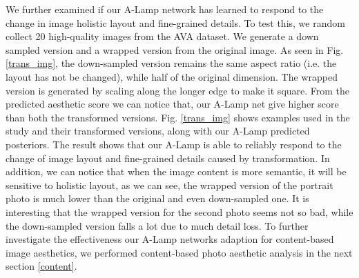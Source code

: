 \documentclass[10pt,twocolumn,letterpaper]{article}
\begin{document}
We further examined if our A-Lamp network has learned to respond to the change in image holistic layout and fine-grained details. To test this, we random collect 20 high-quality images from the AVA dataset. We generate a down sampled version and a wrapped version from the original image. As seen in Fig. \ref*{trans_img}, the down-sampled version remains the same aspect ratio (i.e. the layout has not be changed), while half of the original dimension. The wrapped version is generated by scaling along the longer edge to make it square. From the predicted aesthetic score we can notice that, our A-Lamp net give higher score than both the transformed versions. 
Fig. \ref*{trans_img} shows examples used in the study and their transformed versions, along with our A-Lamp predicted posteriors. The result shows that our A-Lamp is able to reliably respond to the change of image layout and fine-grained details caused by transformation. In addition, we can notice that when the image content is more semantic, it will be sensitive to holistic layout, as we can see, the wrapped version of the portrait photo is much lower than the original and even down-sampled one. It is interesting that the wrapped version for the second photo seems not so bad, while the down-sampled version falls a lot due to much detail loss. To further investigate the effectiveness our A-Lamp networks adaption for content-based image aesthetics, we performed content-based photo aesthetic analysis in the next section \ref{content}.
\end{document}
